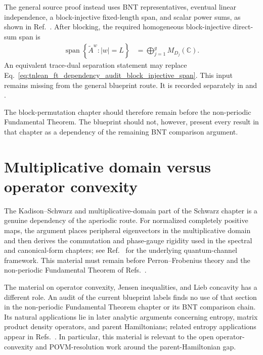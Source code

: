 \documentclass{article}
\begin{document}
The general source proof instead uses BNT representatives, eventual linear
independence, a block-injective fixed-length span, and scalar power sums, as
shown in Ref.~\cite{Cirac2016MPDO_arXiv}. After blocking, the required
homogeneous block-injective direct-sum span is
\begin{align}
    \operatorname{span}
        \left\{\tilde A^w:|w|=L\right\}
        &= \bigoplus_{j=1}^g M_{D_j}(\mathbb{C}).
    \label{eq:tnlean_ft_dependency_audit_block_injective_span}
\end{align}
An equivalent trace-dual separation statement may replace
Eq.~\ref{eq:tnlean_ft_dependency_audit_block_injective_span}. This input
remains missing from the general blueprint route. It is recorded separately
in  and
.

The block-permutation chapter should therefore remain before the non-periodic
Fundamental Theorem. The blueprint should not, however, present every result in
that chapter as a dependency of the remaining BNT comparison argument.

\section{Multiplicative domain versus operator convexity}

The Kadison--Schwarz and multiplicative-domain part of the Schwarz chapter is a
genuine dependency of the aperiodic route. For normalized completely positive
maps, the argument places peripheral eigenvectors in the multiplicative domain
and then derives the commutation and phase-gauge rigidity used in the spectral
and canonical-form chapters; see Ref.~\cite{Wolf2012Quantum} for the underlying
quantum-channel framework. This material must remain before Perron--Frobenius
theory and the non-periodic Fundamental Theorem of
Refs.~\cite{Cirac2016MPDO_arXiv,Cirac2021Matrix}.

The material on operator convexity, Jensen inequalities, and Lieb concavity has
a different role. An audit of the current blueprint labels finds no use of that
section in the non-periodic Fundamental Theorem chapter or its BNT comparison
chain. Its natural applications lie in later analytic arguments concerning
entropy, matrix product density operators, and parent Hamiltonians; related
entropy applications appear in
Refs.~\cite{Beigi2013Sandwiched,MullerLennert2013Renyi}. In particular, this
material is relevant to the open operator-convexity and POVM-resolution work
around the parent-Hamiltonian gap.
\end{document}
